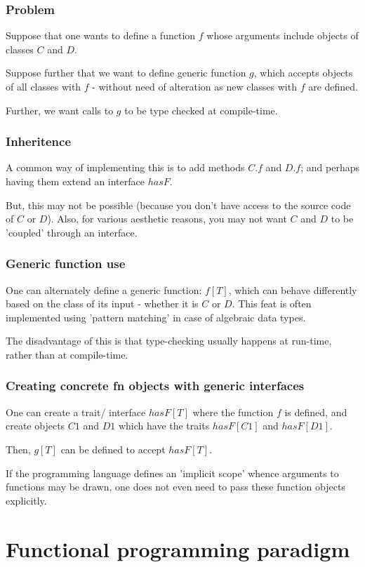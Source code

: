 \documentclass[oneside, article]{memoir}
\begin{document}
\subsubsection{Problem}
Suppose that one wants to define a function $f$ whose arguments include objects of classes $C$ and $D$.

Suppose further that we want to define generic function $g$, which accepts objects of all classes with $f$ - without need of alteration as new classes with $f$ are defined.

Further, we want calls to $g$ to be type checked at compile-time.

\subsubsection{Inheritence}
A common way of implementing this is to add methods $C.f$ and $D.f$; and perhaps having them extend an interface $hasF$.

But, this may not be possible (because you don't have access to the source code of $C$ or $D$). Also, for various aesthetic reasons, you may not want $C$ and $D$ to be 'coupled' through an interface.

\subsubsection{Generic function use}
One can alternately define a generic function: $f[T]$, which can behave differently based on the class of its input - whether it is $C$ or $D$. This feat is often implemented using 'pattern matching' in case of algebraic data types.

The disadvantage of this is that type-checking usually happens at run-time, rather than at compile-time.

\subsubsection{Creating concrete fn objects with generic interfaces}
One can create a trait/ interface $hasF[T]$ where the function $f$ is defined, and create objects $C1$ and $D1$ which have the traits $hasF[C1]$ and $hasF[D1]$.

Then, $g[T]$ can be defined to accept $hasF[T]$.

If the programming language defines an 'implicit scope' whence arguments to functions may be drawn, one does not even need to pass these function objects explicitly.

\section{Functional programming paradigm}
\end{document}
